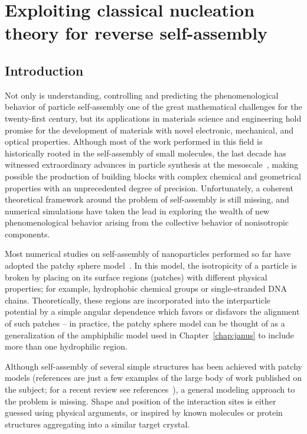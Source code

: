\chapter{Exploiting classical nucleation theory for reverse self-assembly}
\label{chap:pixel}

\section{Introduction}

Not only is understanding, controlling and predicting the phenomenological behavior of particle self-assembly one of the great mathematical challenges for the twenty-first century, but its applications in materials science and engineering hold promise for the development of materials with novel electronic, mechanical, and optical properties.
Although most of the work performed in this field is historically rooted in the self-assembly of small molecules, the last decade has witnessed extraordinary advances in particle synthesis at the mesoscale~\cite{DeVries,Schnablegger,Hong,Weller,Hobbie}, making possible the production of  building blocks  with complex chemical and geometrical properties with an unprecedented degree of precision.
Unfortunately, a coherent theoretical framework around the problem of self-assembly is still missing, and numerical simulations have taken the lead in exploring the wealth of new phenomenological behavior arising from the collective behavior of nonisotropic components.

Most  numerical studies on self-assembly of nanoparticles performed so far have adopted the patchy sphere model~\cite{Kern}.
In this model, the isotropicity of a particle is broken by placing on its surface regions (patches) with different physical properties; for example, hydrophobic chemical groups or single-stranded DNA chains.
Theoretically, these regions are incorporated into the interparticle potential by a simple angular dependence which favors or disfavors the alignment of such patches -- in practice, the patchy sphere model can be thought of as a generalization of the amphiphilic model used in Chapter~\ref{chap:janus} to include more than one hydrophilic region.

Although self-assembly of several simple  structures has been achieved with patchy models (references \cite{glotzer4,Liu,cacciuto} are just a few examples of the large body of work published on the subject; for a recent review see references~\cite{sciortino1,sciortino2}), a general modeling approach to the problem is missing.
Shape and position of the interaction sites is either guessed using physical arguments, or inspired by known molecules or protein structures aggregating into a similar target crystal.

